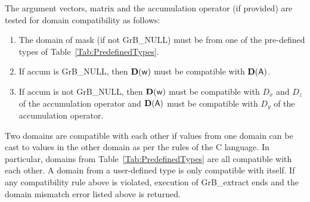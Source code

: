 The argument vectors, matrix and the accumulation 
operator (if provided) are tested for domain compatibility as follows:
\begin{enumerate}
	\item The domain of {\sf mask} (if not {\sf GrB\_NULL}) must be from one of 
    the pre-defined types of Table~\ref{Tab:PredefinedTypes}.

	\item If {\sf accum} is {\sf GrB\_NULL}, then $\bold{D}({\sf w})$ must be 
    compatible with $\bold{D}({\sf A})$.

	\item If {\sf accum} is not {\sf GrB\_NULL}, then $\bold{D}({\sf w})$ must be
    compatible with $D_x$ and $D_z$ of the accumulation operator and 
    $\bold{D}({\sf A})$ must be compatible with $D_y$ of the accumulation operator.
\end{enumerate}
Two domains are compatible with each other if values from one domain can be cast 
to values in the other domain as per the rules of the C language.
In particular, domains from Table~\ref{Tab:PredefinedTypes} are all compatible 
with each other. A domain from a user-defined type is only compatible with itself.
If any compatibility rule above is violated, execution of {\sf GrB\_extract} ends
and the domain mismatch error listed above is returned.

